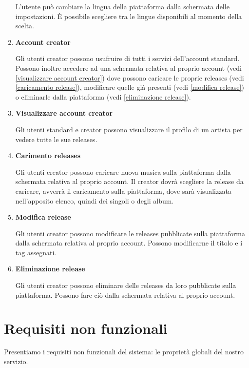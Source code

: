 \documentclass[a4paper,12pt]{article}
\begin{document}
\begin{enumerate}[label=\textbf{RF\arabic*}\;, ref=\textbf{RF\arabic*}]
    L'utente può cambiare la lingua della piattaforma dalla schermata delle impostazioni. È possibile scegliere tra le lingue disponibili al momento della scelta.
    \item \label{account creator} \textbf{Account creator}
    
    Gli utenti creator possono usufruire di tutti i servizi dell’account standard. Possono inoltre accedere ad una schermata relativa al proprio account (vedi \ref{visualizzare account creator}) dove possono caricare le proprie releases (vedi \ref{caricamento release}), modificare quelle già presenti (vedi \ref{modifica release}) o eliminarle dalla piattaforma (vedi \ref{eliminazione release}).
    \item \label{visualizzare account creator} \textbf{Visualizzare account creator}
    
    Gli utenti standard e creator possono visualizzare il profilo di un artista per vedere tutte le sue releases.
    \item \label{caricamento release} \textbf{Carimento releases}
    
    Gli utenti creator possono caricare nuova musica sulla piattaforma dalla schermata relativa al proprio account. Il creator dovrà scegliere la release da caricare, avverrà il caricamento sulla piattaforma, dove sarà visualizzata nell’apposito elenco, quindi dei singoli o degli album.
    \item \label{modifica release} \textbf{Modifica release}
    
    Gli utenti creator possono modificare le releases pubblicate sulla piattaforma dalla schermata relativa al proprio account. Possono modificarne il titolo e i tag assegnati. 
    \item \label{eliminazione release} \textbf{Eliminazione release}
    
    Gli utenti creator possono eliminare delle releases da loro pubblicate sulla piattaforma. Possono fare ciò dalla schermata relativa al proprio account.
\end{enumerate}

\newpage
\section{Requisiti non funzionali}

Presentiamo i requisiti non funzionali del sistema: le proprietà globali del nostro servizio.
\end{document}
